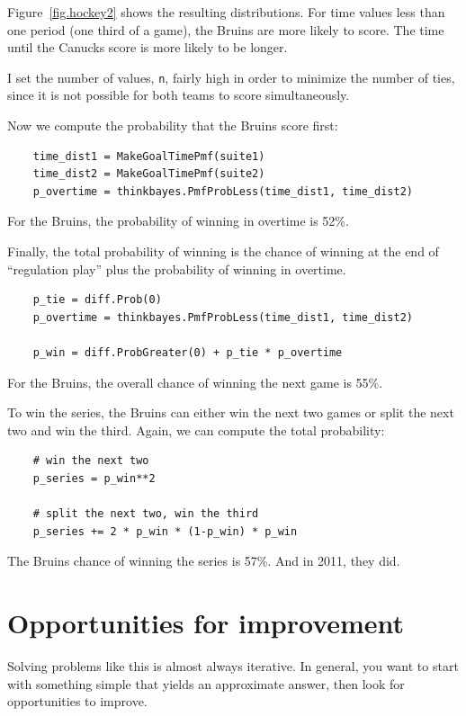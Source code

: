 \documentclass[12pt]{book}
\begin{document}
Figure~\ref{fig.hockey2} shows the resulting distributions.  For
time values less than one period (one third of a game), the Bruins
are more likely to score.  The time until the Canucks score is
more likely to be longer.

I set the number of values, {\tt n}, fairly high in order to minimize
the number of ties, since it is not possible for both teams
to score simultaneously.

Now we compute the probability that the Bruins score first:

\begin{verbatim}
    time_dist1 = MakeGoalTimePmf(suite1)
    time_dist2 = MakeGoalTimePmf(suite2)
    p_overtime = thinkbayes.PmfProbLess(time_dist1, time_dist2)
\end{verbatim}  

For the Bruins, the probability of winning in overtime is 52\%.

Finally, the total probability of winning is the chance of
winning at the end of ``regulation play'' plus the probability
of winning in overtime.

\begin{verbatim}
    p_tie = diff.Prob(0)
    p_overtime = thinkbayes.PmfProbLess(time_dist1, time_dist2)

    p_win = diff.ProbGreater(0) + p_tie * p_overtime
\end{verbatim}  

For the Bruins, the overall chance of winning the next game is 55\%.

To win the series, the Bruins can either win the next two games
or split the next two and win the third.  Again, we can compute
the total probability:

\begin{verbatim}
    # win the next two
    p_series = p_win**2

    # split the next two, win the third
    p_series += 2 * p_win * (1-p_win) * p_win
\end{verbatim}  

The Bruins chance of winning the series is 57\%.  And in 2011,
they did.


\section{Opportunities for improvement}

Solving problems like this is almost always iterative.  In general,
you want to start with something simple that yields an approximate
answer, then look for opportunities to improve.
\end{document}

